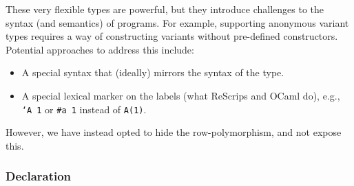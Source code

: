 \documentclass[11pt]{article}
\begin{document}
These very flexible types are powerful, but they introduce challenges to the
syntax (and semantics) of programs. For example, supporting anonymous variant
types requires a way of constructing variants without pre-defined constructors.
Potential approaches to address this include:

\begin{itemize}
\item A special syntax that (ideally) mirrors the syntax of the type.
\item A special lexical marker on the labels (what ReScrips and OCaml do),
e.g., \texttt{`A 1} or \texttt{\#a 1} instead of \texttt{A(1)}.
\end{itemize}

However, we have instead opted to hide the row-polymorphism, and not expose
this.

\subsubsection{Declaration}
\label{sec:org9d13082}
\end{document}
